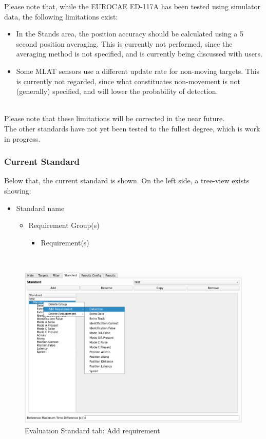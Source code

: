 Please note that, while the EUROCAE ED-117A has been tested using simulator data, the following limitations exist:
\begin{itemize}  
\item In the Stands area, the position accuracy should be calculated using a 5 second position averaging. This is currently not performed, since the averaging method is not specified, and is currently being discussed with users.
\item Some MLAT sensors use a different update rate for non-moving targets. This is currently not regarded, since what constituates non-movement is not (generally) specified, and will lower the probability of detection. 
\end{itemize}
\ \\

Please note that these limitations will be corrected in the near future. \\ 

The other standards have not yet been tested to the fullest degree, which is work in progress.


\subsubsection{Current Standard}

Below that, the current standard is shown. On the left side, a tree-view exists showing:
\begin{itemize}  
\item Standard name
\begin{itemize}  
\item Requirement Group(s)
\begin{itemize}  
\item Requirement(s)
\end{itemize}
\end{itemize}
\end{itemize}
\ \\

\begin{figure}[H]
  \hspace*{-2cm}
    \includegraphics[width=18cm,frame]{figures/eval_standard_add_req.png}
  \caption{Evaluation Standard tab: Add requirement}
\end{figure}

